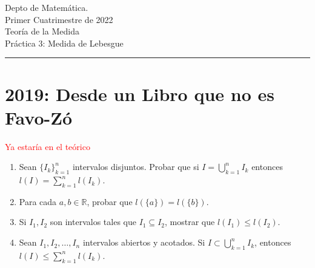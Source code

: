 \documentclass{book}
\newcommand{\rr}{\mathbb{R}}
\begin{document}


\begin{large}
\begin{bfseries} %
        \noindent Depto de Matem\'atica.\\
        Primer Cuatrimestre de 2022\\                                                                                                                                                                                                                                                                                                                                                
        Teoría de la Medida \\
        Práctica 3: Medida de Lebesgue

\end{bfseries}
\end{large}
\par\noindent\rule{\textwidth}{.5pt}









\section{2019: Desde un Libro que no es Favo-Z\'o}




\begin{ejer}{} 

\textcolor{red}{Ya estaría en el teórico}
\begin{enumerate}
\item
Sean $\{I_k\}_{k=1}^n$ intervalos disjuntos.  
Probar que si $I=\bigcup\limits_{k=1}^n I_k$ entonces $l(I)=\sum\limits_{k=1}^n l(I_k)$.
\item Para cada $a,b\in \rr$, probar que $l(\{a\})=l(\{b\})$.
\item Si $I_1, I_2$ son intervalos tales que $I_1\subseteq I_2$, mostrar que $l(I_1)\leq l(I_2)$.
\item Sean $I_1,I_2,\dots,I_n$ intervalos abiertos y acotados. 
Si $I\subset \bigcup\limits_{k=1}^n I_k$, entonces $l(I)\leq \sum\limits_{k=1}^n l(I_k)$.
\end{enumerate}
\end{ejer}
\end{document}

